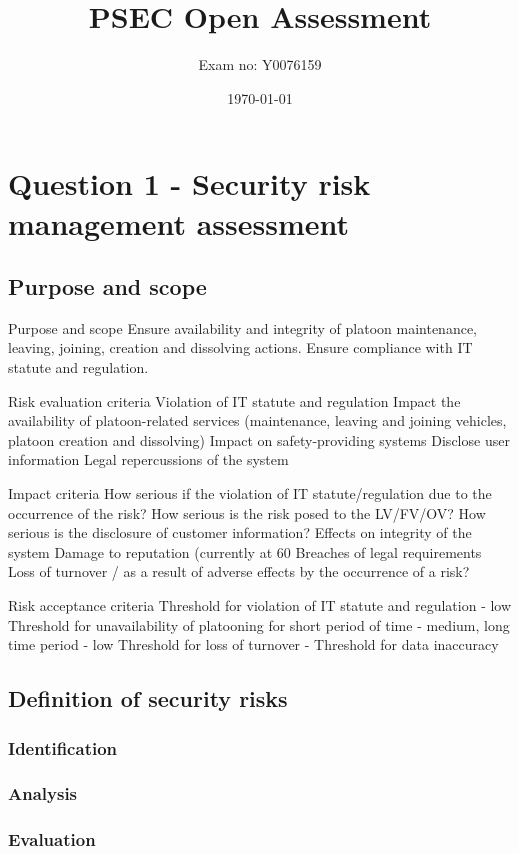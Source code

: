 \documentclass[british,11pt,a4paper]{article}
\begin{document}
\title{PSEC Open Assessment}
\author{Exam no: Y0076159}
\date{\today}
\maketitle
\tableofcontents
\clearpage


\section{Question 1 - Security risk management assessment}
\subsection{Purpose and scope}
Purpose and scope
Ensure availability and integrity of platoon maintenance, leaving, joining, creation and dissolving actions. Ensure compliance with IT statute and regulation.

Risk evaluation criteria
Violation of IT statute and regulation
Impact the availability of platoon-related services (maintenance, leaving and joining vehicles, platoon creation and dissolving)
Impact on safety-providing systems
Disclose user information
Legal repercussions of the system

Impact criteria
How serious if the violation of IT statute/regulation due to the occurrence of the risk?
How serious is the risk posed to the LV/FV/OV?
How serious is the disclosure of customer information?
Effects on integrity of the system
Damage to reputation (currently at 60%
Breaches of legal requirements
Loss of turnover / as a result of adverse effects by the occurrence of a risk?

Risk acceptance criteria
Threshold for violation of IT statute and regulation - low
Threshold for unavailability of platooning for short period of time - medium, long time period - low
Threshold for loss of turnover -
Threshold for data inaccuracy
\subsection{Definition of security risks}
\subsubsection{Identification}
\subsubsection{Analysis}
\subsubsection{Evaluation}
\end{document}
